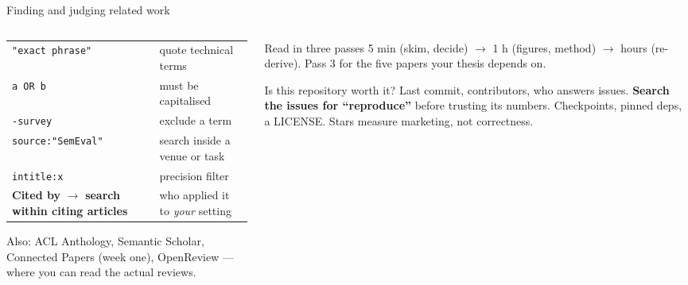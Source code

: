 \documentclass[aspectratio=169,11pt]{beamer}
\newcommand{\code}[1]{\texttt{\small #1}}
\newcommand{\key}[1]{\textbf{\color{brand}#1}}
\begin{document}
\begin{frame}{Finding and judging related work}
\begin{columns}[T]
\begin{column}{0.54\textwidth}
\footnotesize
\begin{tabularx}{\linewidth}{>{\raggedright\arraybackslash}p{3.0cm} X}
\toprule
\rowcolor{rowtint} \code{"exact phrase"} & quote technical terms \\
\code{a OR b} & must be capitalised \\
\rowcolor{rowtint} \code{-survey} & exclude a term \\
\code{source:"SemEval"} & search inside a venue or task \\
\rowcolor{rowtint} \code{intitle:x} & precision filter \\
\textbf{Cited by} $\rightarrow$ \textbf{search within citing articles} & who
applied it to \emph{your} setting \\
\bottomrule
\end{tabularx}

\medskip
Also: ACL Anthology, Semantic Scholar, Connected Papers (week one), OpenReview
--- where you can read the actual reviews.
\end{column}
\begin{column}{0.44\textwidth}
\begin{block}{Read in three passes}
\footnotesize
5 min (skim, decide) $\rightarrow$ 1 h (figures, method) $\rightarrow$ hours
(re-derive). Pass 3 for the five papers your thesis depends on.
\end{block}
\begin{alertblock}{Is this repository worth it?}
\footnotesize\sloppy
Last commit, contributors, who answers issues. \key{Search the issues for
``reproduce''} before trusting its numbers. Checkpoints, pinned deps, a
LICENSE. Stars measure marketing, not correctness.
\end{alertblock}
\end{column}
\end{columns}
\end{frame}
\end{document}
